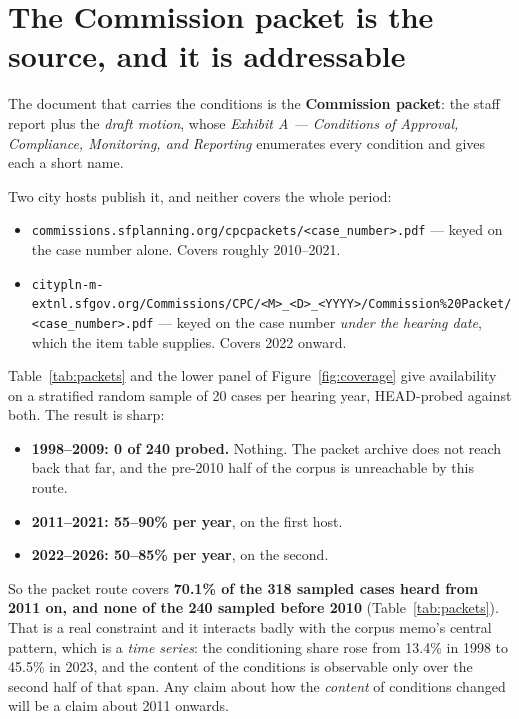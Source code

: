 \documentclass[11pt]{article}
\begin{document}
\section{The Commission packet is the source, and it is addressable}

The document that carries the conditions is the \textbf{Commission packet}: the staff report
plus the \emph{draft motion}, whose \emph{Exhibit A --- Conditions of Approval, Compliance,
Monitoring, and Reporting} enumerates every condition and gives each a short name.

Two city hosts publish it, and neither covers the whole period:

\begin{itemize}
\item \texttt{commissions.sfplanning.org/cpcpackets/<case\_number>.pdf} --- keyed on the case
number alone. Covers roughly 2010--2021.
\item \texttt{citypln-m-extnl.sfgov.org/Commissions/CPC/<M>\_<D>\_<YYYY>/Commission\%20Packet/}
\texttt{<case\_number>.pdf} --- keyed on the case number \emph{under the hearing date}, which
the item table supplies. Covers 2022 onward.
\end{itemize}

Table~\ref{tab:packets} and the lower panel of Figure~\ref{fig:coverage} give availability on a
stratified random sample of 20 cases per hearing year, HEAD-probed against both. The result is
sharp:

\begin{itemize}
\item \textbf{1998--2009: 0 of 240 probed.} Nothing. The packet archive does not reach back that far,
and the pre-2010 half of the corpus is unreachable by this route.
\item \textbf{2011--2021: 55--90\% per year}, on the first host.
\item \textbf{2022--2026: 50--85\% per year}, on the second.
\end{itemize}

So the packet route covers \textbf{70.1\% of the 318 sampled cases heard from 2011 on, and
none of the 240 sampled before 2010} (Table~\ref{tab:packets}). That is a real constraint and it interacts badly with the corpus memo's central
pattern, which is a \emph{time series}: the conditioning share rose from 13.4\% in 1998 to
45.5\% in 2023, and the content of the conditions is observable only over the second half of
that span. Any claim about how the \emph{content} of conditions changed will be a claim about
2011 onwards.
\end{document}
